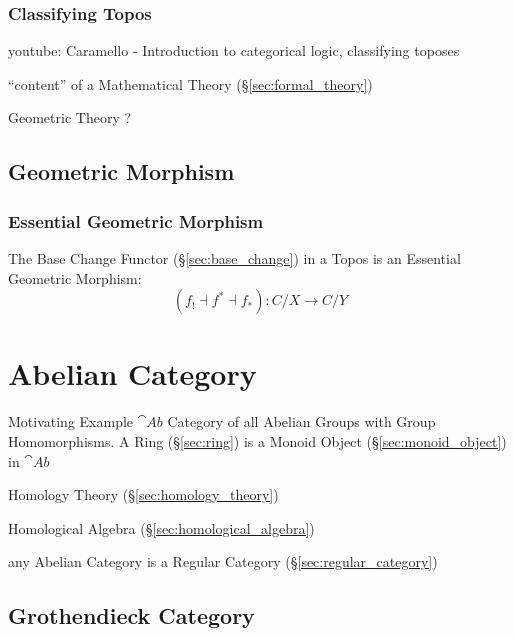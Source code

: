 \subsubsection{Classifying Topos}\label{sec:classifying_topos}

youtube: Caramello - Introduction to categorical logic, classifying
toposes

``content'' of a Mathematical Theory (\S\ref{sec:formal_theory})

Geometric Theory ?



\subsection{Geometric Morphism}\label{sec:geometric_morphism}

\subsubsection{Essential Geometric Morphism}
\label{sec:essential_geometric}

The Base Change Functor (\S\ref{sec:base_change}) in a Topos is an
Essential Geometric Morphism:
\[
  (f_! \dashv f^* \dashv f_*):C/X \rightarrow C/Y
\]



\section{Abelian Category}\label{sec:abelian_category}

Motivating Example $\cat{Ab}$ Category of all Abelian Groups with
Group Homomorphisms. A Ring (\S\ref{sec:ring}) is a Monoid Object
(\S\ref{sec:monoid_object}) in $\cat{Ab}$

Homology Theory (\S\ref{sec:homology_theory})

Homological Algebra (\S\ref{sec:homological_algebra})

any Abelian Category is a Regular Category
(\S\ref{sec:regular_category})



\subsection{Grothendieck Category}\label{sec:grothendieck_category}

